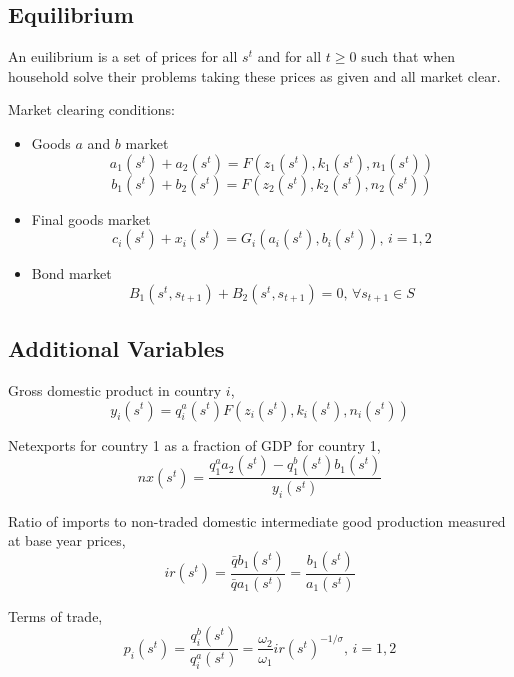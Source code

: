 \documentclass[11pt,a4paper]{article}
\begin{document}
\subsection{Equilibrium}
An euilibrium is a set of prices for all $s^t$ and for all $t\geq 0$ such that when household solve their problems taking these prices as given and all market clear.

Market clearing conditions:
\begin{itemize}
	\item  Goods $a$ and $b$ market
    \begin{equation}
    a_1(s^t)+a_2(s^t)=F(z_1(s^t),k_1(s^t),n_1(s^t))
    \end{equation}
    \begin{equation}
    b_1(s^t)+b_2(s^t)=F(z_2(s^t),k_2(s^t),n_2(s^t))
    \end{equation}
    \item Final goods market
    \begin{equation}
    c_i(s^t)+x_i(s^t)=G_i(a_i(s^t),b_i(s^t)),\, i=1,2
    \end{equation}
    \item Bond market
    \begin{equation}
    B_1(s^t,s_{t+1})+B_2(s^t,s_{t+1})=0,\, \forall s_{t+1}\in S
    \end{equation}
    
\end{itemize}

\subsection{Additional Variables}
Gross domestic product in country $i$,
\begin{equation}
y_i(s^t)=q_i^a(s^t)F(z_i(s^t),k_i(s^t),n_i(s^t))
\end{equation}

Netexports for country 1 as a fraction of GDP for country 1,
\begin{equation}
nx(s^t)=\frac{q_1^aa_2(s^t)-q_1^b(s^t)b_1(s^t)}{y_i(s^t)}
\end{equation}

Ratio of imports to non-traded domestic intermediate good production measured at base year prices,
\begin{equation}
ir(s^t)=\frac{\bar{q}b_1(s^t)}{\bar{q}a_1(s^t)}=\frac{b_1(s^t)}{a_1(s^t)}
\end{equation}

Terms of trade,
\begin{equation}
p_i(s^t)=\frac{q_i^b(s^t)}{q_i^a(s^t)}=\frac{\omega_2}{\omega_1}{ir(s^t)}^{-1/\sigma},\,i=1,2
\end{equation}
\end{document}
